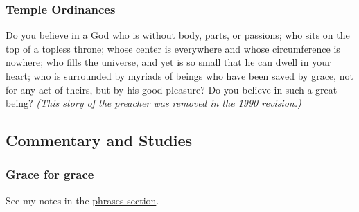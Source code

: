 		
	\subsubsection{Temple Ordinances}
		\label{GRACE-TEMPLE}
	
		\begin{compactdesc}
			\item[{\hyperref[TEMPLE-ENDOWMENT-ENDOW-PRE-1990-TELESTIAL]{Preacher's speech}}] Do you believe in a God who is without body, parts, or passions; who sits on the top of a topless throne; whose center is everywhere and whose circumference is nowhere; who fills the universe, and yet is so small that he can dwell in your heart; who is surrounded by myriads of beings who have been saved by grace, not for any act of theirs, but by his good pleasure? Do you believe in such a great being? \textit{(This story of the preacher was removed in the 1990 revision.)}
		\end{compactdesc}
	
	
	
\subsection{Commentary and Studies} %
	\label{GRACE-COMMENTARY}

	
		
	\subsubsection{Grace for grace}
		\label{GRACE-for}
		
		See my notes in the \hyperref[GRACE-PHRASES]{phrases section}.